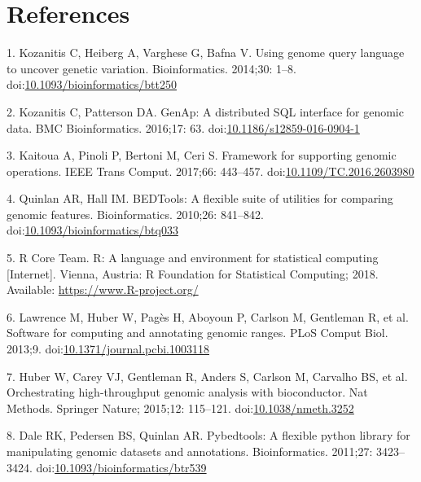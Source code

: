 \documentclass[10pt,letterpaper]{article}
\begin{document}
\hypertarget{references}{%
\section*{References}\label{references}}

\hypertarget{refs}{}
\leavevmode\hypertarget{ref-Kozanitis2014-va}{}%
1. Kozanitis C, Heiberg A, Varghese G, Bafna V. Using genome query
language to uncover genetic variation. Bioinformatics. 2014;30: 1--8.
doi:\href{https://doi.org/10.1093/bioinformatics/btt250}{10.1093/bioinformatics/btt250}

\leavevmode\hypertarget{ref-Kozanitis2016-bm}{}%
2. Kozanitis C, Patterson DA. GenAp: A distributed SQL interface for
genomic data. BMC Bioinformatics. 2016;17: 63.
doi:\href{https://doi.org/10.1186/s12859-016-0904-1}{10.1186/s12859-016-0904-1}

\leavevmode\hypertarget{ref-Kaitoua2017-pw}{}%
3. Kaitoua A, Pinoli P, Bertoni M, Ceri S. Framework for supporting
genomic operations. IEEE Trans Comput. 2017;66: 443--457.
doi:\href{https://doi.org/10.1109/TC.2016.2603980}{10.1109/TC.2016.2603980}

\leavevmode\hypertarget{ref-Quinlan2010-gc}{}%
4. Quinlan AR, Hall IM. BEDTools: A flexible suite of utilities for
comparing genomic features. Bioinformatics. 2010;26: 841--842.
doi:\href{https://doi.org/10.1093/bioinformatics/btq033}{10.1093/bioinformatics/btq033}

\leavevmode\hypertarget{ref-r-core}{}%
5. R Core Team. R: A language and environment for statistical computing
{[}Internet{]}. Vienna, Austria: R Foundation for Statistical Computing;
2018. Available: \url{https://www.R-project.org/}

\leavevmode\hypertarget{ref-Lawrence2013-wg}{}%
6. Lawrence M, Huber W, Pagès H, Aboyoun P, Carlson M, Gentleman R, et
al. Software for computing and annotating genomic ranges. PLoS Comput
Biol. 2013;9.
doi:\href{https://doi.org/10.1371/journal.pcbi.1003118}{10.1371/journal.pcbi.1003118}

\leavevmode\hypertarget{ref-Huber2015-ei}{}%
7. Huber W, Carey VJ, Gentleman R, Anders S, Carlson M, Carvalho BS, et
al. Orchestrating high-throughput genomic analysis with bioconductor.
Nat Methods. Springer Nature; 2015;12: 115--121.
doi:\href{https://doi.org/10.1038/nmeth.3252}{10.1038/nmeth.3252}

\leavevmode\hypertarget{ref-Dale2011-js}{}%
8. Dale RK, Pedersen BS, Quinlan AR. Pybedtools: A flexible python
library for manipulating genomic datasets and annotations.
Bioinformatics. 2011;27: 3423--3424.
doi:\href{https://doi.org/10.1093/bioinformatics/btr539}{10.1093/bioinformatics/btr539}
\end{document}
